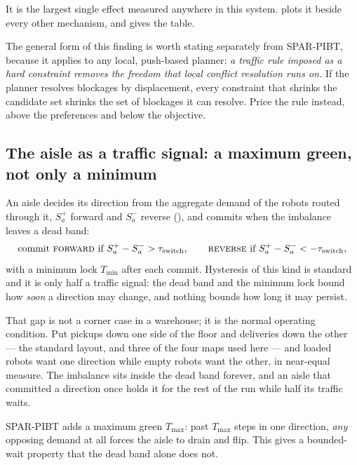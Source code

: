 It is the largest single effect measured anywhere in this system.  plots it beside every other
mechanism, and  gives the table.

\begin{caveat}
The general form of this finding is worth stating separately from SPAR-PIBT,
because it applies to any local, push-based planner: \emph{a traffic rule
imposed as a hard constraint removes the freedom that local conflict resolution
runs on.} If the planner resolves blockages by displacement, every constraint
that shrinks the candidate set shrinks the set of blockages it can resolve.
Price the rule instead, above the preferences and below the objective.
\end{caveat}

\subsection{The aisle as a traffic signal: a maximum green, not only a minimum}
\label{sec:contribution-maxgreen}

An aisle decides its direction from the aggregate demand of the robots routed
through it, $S_a^{+}$ forward and $S_a^{-}$ reverse
(), and commits when the imbalance leaves a dead band:
\begin{equation}
  \text{commit \textsc{forward} if } S_a^{+} - S_a^{-} > \tau_{\mathrm{switch}},
  \qquad
  \text{\textsc{reverse} if } S_a^{+} - S_a^{-} < -\tau_{\mathrm{switch}},
\end{equation}
with a minimum lock $T_{\min}$ after each commit. Hysteresis of this kind is
standard and it is only half a traffic signal: the dead band and the minimum
lock bound how \emph{soon} a direction may change, and nothing bounds how long
it may persist.

That gap is not a corner case in a warehouse; it is the normal operating
condition. Put pickups down one side of the floor and deliveries down the
other --- the standard layout, and three of the four maps used here --- and
loaded robots want one direction while empty robots want the other, in
near-equal measure. The imbalance sits inside the dead band forever, and an
aisle that committed a direction once holds it for the rest of the run while
half its traffic waits.

SPAR-PIBT adds a maximum green $T_{\max}$: past $T_{\max}$ steps in one
direction, \emph{any} opposing demand at all forces the aisle to drain and
flip. This gives a bounded-wait property that the dead band alone does not.

